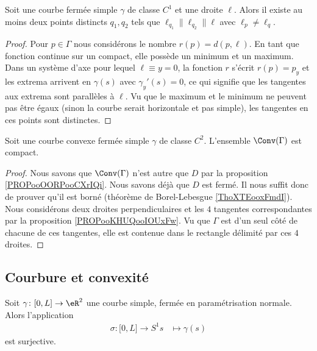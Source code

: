 \begin{proposition}     \label{PROPooKHUQooIOUxFw}
    Soit une courbe fermée simple \( \gamma\) de classe \( C^1\) et une droite \( \ell\). Alors il existe au moins deux points distincts \( q_1,q_2\) tels que \( \ell_{q_1}\parallel \ell_{q_2}\parallel\ell\) avec \( \ell_p\neq \ell_q\).
\end{proposition}

\begin{proof}
    Pour \( p\in \Gamma\) nous considérons le nombre \( r(p)=d(p,\ell)\). En tant que fonction continue sur un compact, elle possède un minimum et un maximum. Dans un système d'axe pour lequel \( \ell\equiv y=0\), la fonction \( r\) s'écrit \( r(p)=p_y\) et les extrema arrivent en \( \gamma(s)\) avec \( \gamma_y'(s)=0\), ce qui signifie que les tangentes aux extrema sont parallèles à \( \ell\). Vu que le maximum et le minimum ne peuvent pas être égaux (sinon la courbe serait horizontale et pas simple), les tangentes en ces points sont distinctes.
\end{proof}

\begin{corollary}
    Soit une courbe convexe fermée simple \( \gamma\) de classe \( C^2\). L'ensemble $\Conv(\Gamma)$ est compact.
\end{corollary}

\begin{proof}
    Nous savons que \( \Conv(\Gamma)\) n'est autre que \( D\) par la proposition \ref{PROPooOORPooCXrIQi}. Nous savons déjà que \( D\) est fermé. Il nous suffit donc de prouver qu'il est borné (théorème de Borel-Lebesgue \ref{ThoXTEooxFmdI}). Nous considérons deux droites perpendiculaires et les \( 4\) tangentes correspondantes par la proposition \ref{PROPooKHUQooIOUxFw}. Vu que \( \Gamma\) est d'un seul côté de chacune de ces tangentes, elle est contenue dans le rectangle délimité par ces \( 4\) droites.
\end{proof}

\subsection{Courbure et convexité}

\begin{lemma}       \label{LEMooHMFSooFlhanD}
    Soit \(   \gamma\colon \mathopen[ 0 , L \mathclose]\to \eR^2    \) une courbe simple, fermée en paramétrisation normale. Alors l'application
    \begin{equation}
        \begin{aligned}
            \sigma\colon \mathopen[ 0 , L \mathclose]\to S^1
            s&\mapsto \gamma(s) 
        \end{aligned}
    \end{equation}
    est surjective.
\end{lemma}


